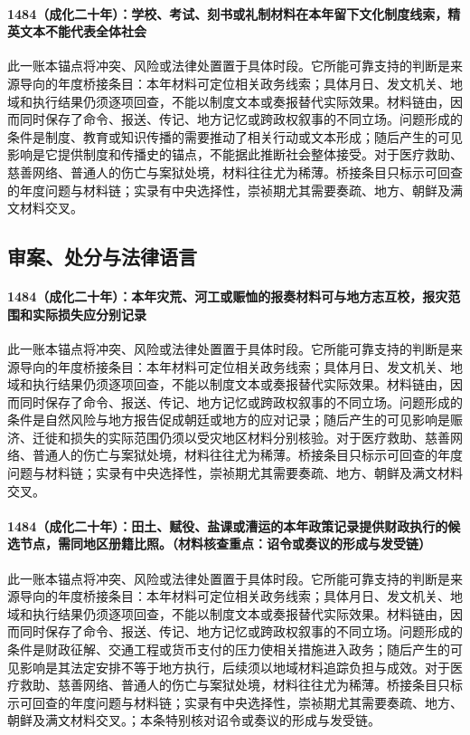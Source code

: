 \paragraph{1484（成化二十年）：学校、考试、刻书或礼制材料在本年留下文化制度线索，精英文本不能代表全体社会} 此一账本锚点将冲突、风险或法律处置置于具体时段。它所能可靠支持的判断是来源导向的年度桥接条目：本年材料可定位相关政务线索；具体月日、发文机关、地域和执行结果仍须逐项回查，不能以制度文本或奏报替代实际效果。材料链由，因而同时保存了命令、报送、传记、地方记忆或跨政权叙事的不同立场。问题形成的条件是制度、教育或知识传播的需要推动了相关行动或文本形成；随后产生的可见影响是它提供制度和传播史的锚点，不能据此推断社会整体接受。对于医疗救助、慈善网络、普通人的伤亡与案狱处境，材料往往尤为稀薄。桥接条目只标示可回查的年度问题与材料链；实录有中央选择性，崇祯期尤其需要奏疏、地方、朝鲜及满文材料交叉。

\subsection{审案、处分与法律语言}

\paragraph{1484（成化二十年）：本年灾荒、河工或赈恤的报奏材料可与地方志互校，报灾范围和实际损失应分别记录} 此一账本锚点将冲突、风险或法律处置置于具体时段。它所能可靠支持的判断是来源导向的年度桥接条目：本年材料可定位相关政务线索；具体月日、发文机关、地域和执行结果仍须逐项回查，不能以制度文本或奏报替代实际效果。材料链由，因而同时保存了命令、报送、传记、地方记忆或跨政权叙事的不同立场。问题形成的条件是自然风险与地方报告促成朝廷或地方的应对记录；随后产生的可见影响是赈济、迁徙和损失的实际范围仍须以受灾地区材料分别核验。对于医疗救助、慈善网络、普通人的伤亡与案狱处境，材料往往尤为稀薄。桥接条目只标示可回查的年度问题与材料链；实录有中央选择性，崇祯期尤其需要奏疏、地方、朝鲜及满文材料交叉。

\paragraph{1484（成化二十年）：田土、赋役、盐课或漕运的本年政策记录提供财政执行的候选节点，需同地区册籍比照。（材料核查重点：诏令或奏议的形成与发受链）} 此一账本锚点将冲突、风险或法律处置置于具体时段。它所能可靠支持的判断是来源导向的年度桥接条目：本年材料可定位相关政务线索；具体月日、发文机关、地域和执行结果仍须逐项回查，不能以制度文本或奏报替代实际效果。材料链由，因而同时保存了命令、报送、传记、地方记忆或跨政权叙事的不同立场。问题形成的条件是财政征解、交通工程或货币支付的压力使相关措施进入政务；随后产生的可见影响是其法定安排不等于地方执行，后续须以地域材料追踪负担与成效。对于医疗救助、慈善网络、普通人的伤亡与案狱处境，材料往往尤为稀薄。桥接条目只标示可回查的年度问题与材料链；实录有中央选择性，崇祯期尤其需要奏疏、地方、朝鲜及满文材料交叉。；本条特别核对诏令或奏议的形成与发受链。

